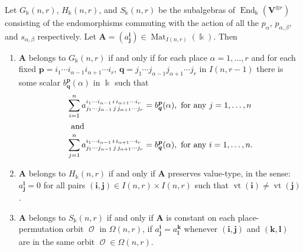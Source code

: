 \documentclass[ALCO,ThmDefs,Unicode,epreuves]{cedram}
\DeclareMathOperator{\End}{End}
\DeclareMathOperator{\Mat}{Mat}
\DeclareMathOperator{\Orb}{\mathcal{O}}
\DeclareMathOperator{\vt}{vt}
\newcommand{\bi}{{\boldsymbol{i}}} %
\newcommand{\bj}{{\boldsymbol{j}}}
\newcommand{\bk}{{\boldsymbol{k}}}
\newcommand{\bl}{{\boldsymbol{l}}}
\newcommand{\bp}{{\boldsymbol{p}}}
\newcommand{\bq}{{\boldsymbol{q}}}
\newcommand{\bA}{\mathbf{A}}
\newcommand{\V}{\mathbf{V}} %
\begin{document}
\begin{prop}\label{prop:GHS}
 Let $G_\Bbbk(n,r)$, $H_\Bbbk(n,r)$, and $S_\Bbbk(n,r)$ be the
 subalgebras of $\End_\Bbbk( \V^{\otimes r} )$ consisting of
 the endomorphisms commuting with the action of all the $p_\alpha$,
 $p_{\alpha,\beta}$, and $s_{\alpha,\beta}$ respectively. Let $\bA =
 ( a^{\bi}_{\bj} ) \in \Mat_{I(n,r)}(\Bbbk)$. Then
\begin{enumerate}[label=(\alph*)]
\item\label{prop3.2_a} $\bA$ belongs to $G_\Bbbk(n,r)$ if and only if for each place
 $\alpha = 1, \dots, r$ and for each fixed $\bp = i_1 \cdots
 i_{\alpha-1} i_{\alpha+1}\cdots i_r$, $\bq = j_1 \cdots j_{\alpha-1}
 j_{\alpha+1} \cdots j_r$ in $I(n,r-1)$ there is some scalar
 $b^\bp_\bq(\alpha)$ in $\Bbbk$ such that
 \begin{align*}
 \sum_{i = 1}^n a^{i_1 \cdots i_{\alpha-1}\, i\, i_{\alpha+1}
 \cdots i_r}_{j_1 \cdots j_{\alpha-1}\, j\, j_{\alpha+1} \cdots
 j_r} &= b^\bp_\bq(\alpha), \text{ for any } j = 1, \dots, n
 \\ \intertext{ and} \sum_{j = 1}^n a^{i_1 \cdots i_{\alpha-1}\,
 i\, i_{\alpha+1} \cdots i_r}_{j_1 \cdots j_{\alpha-1}\, j\,
 j_{\alpha+1} \cdots j_r} &= b^\bp_\bq(\alpha), \text{ for any }
 i = 1, \dots, n.
 \end{align*}

\item\label{prop3.2_b} $\bA$ belongs to $H_\Bbbk(n,r)$ if and only if $\bA$ preserves
 value-type, in the sense: $a^{\bi}_{\bj} = 0$ for all pairs
 $(\bi,\bj) \in I(n,r) \times I(n,r)$ such that $\vt(\bi) \ne
 \vt(\bj)$.
 
\item\label{prop3.2_c} $\bA$ belongs to $S_\Bbbk(n,r)$ if and only if $\bA$ is constant
 on each place-permutation orbit $\Orb$ in $\Omega(n,r)$, \ie if
 $a^\bi_\bj = a^\bk_\bl$ whenever $(\bi,\bj)$ and $(\bk,\bl)$ are in
 the same orbit $\Orb \in \Omega(n,r)$.
\end{enumerate}
\end{prop}
\end{document}
